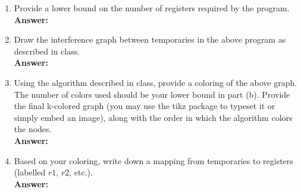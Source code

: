 \documentclass[11pt]{article}
\begin{document}
\begin{enumerate}
\begin{enumerate}
   \newpage
    \item Provide a lower bound on the number of registers required by the program.\\
    \textbf{Answer:} 
    
   \newpage
    \item Draw the interference graph between temporaries in the above program as described in class.\\
    \textbf{Answer:} 
    
   \newpage
    \item Using the algorithm described in class, provide a coloring of the above graph. The number of colors used should be your lower bound in part (b). Provide the final k-colored graph (you may use the tikz package to typeset it or simply embed an image), along with the order in which the algorithm colors the nodes.\\
    \textbf{Answer:} 
    
   \newpage
    \item Based on your coloring, write down a mapping from temporaries to registers (labelled $r1$, $r2$, etc.).\\
    \textbf{Answer:} 
    
   \newpage
  \end{enumerate}
  
\end{enumerate}
\end{document}
